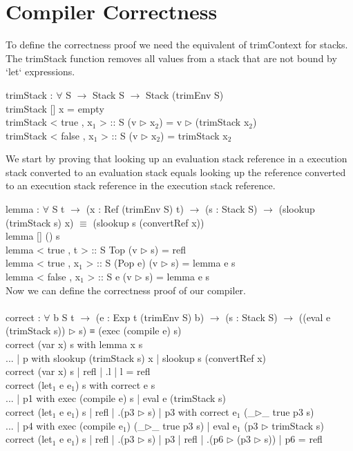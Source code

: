 \documentclass[paper=a4, fontsize=11pt]{scrartcl} %
\numberwithin{equation}{section} %
\numberwithin{figure}{section} %
\numberwithin{table}{section} %
\begin{document}
\section{Compiler Correctness}
To define the correctness proof we need the equivalent of trimContext for stacks. The trimStack function removes all values from a stack that are not bound by `let` expressions.\\
\ttfamily

trimStack : $\forall$ {S} $\rightarrow$ Stack S $\rightarrow$ Stack (trimEnv S)\\
trimStack {[]} x = empty\\
trimStack {< true , x$_1$ > :: S} (v $\rhd$ x$_2$) = v $\rhd$ (trimStack x$_2$)\\
trimStack {< false , x$_1$ > :: S} (v $\rhd$ x$_2$) = trimStack x$_2$\\

\normalfont

We start by proving that looking up an evaluation stack reference in a execution stack converted to an evaluation stack equals looking up the reference converted to an execution stack reference in the execution stack reference.\\
\ttfamily

lemma : $\forall$ {S t} $\rightarrow$ (x : Ref (trimEnv S) t) $\rightarrow$ (s : Stack S) $\rightarrow$ (slookup (trimStack s) x) $\equiv$ (slookup s (convertRef x))\\
lemma {[]} () s\\
lemma {< true , t > :: S} Top (v $\rhd$ s) = refl\\
lemma {< true , x$_1$ > :: S} (Pop e) (v $\rhd$ s) = lemma e s\\
lemma {< false , x$_1$ > :: S} e (v $\rhd$ s) = lemma e s\\

\normalfont
Now we can define the correctness proof of our compiler.\\
\ttfamily
\\
correct : $\forall$ {b S t} $\rightarrow$ (e : Exp t (trimEnv S) b) $\rightarrow$ (s : Stack S) $\rightarrow$ ((eval e (trimStack s)) $\rhd$ s) ≡ (exec (compile e) s)\\
correct (var x) s with lemma x s\\
... | p with slookup (trimStack s) x | slookup s (convertRef x) \\
correct (var x) s | refl | .l | l = refl\\
correct (let$_1$ e e$_1$) s with correct e s\\
... | p1 with exec (compile e) s | eval e (trimStack s)\\
correct (let$_1$ e e$_1$) s | refl | .(p3 $\rhd$ s) | p3 with correct e$_1$ (\_$\rhd$\_ {true} p3 s)\\
... | p4 with exec (compile e$_1$) (\_$\rhd$\_ {true} p3 s) | eval e$_1$ (p3 $\rhd$ trimStack s)\\
correct (let$_1$ e e$_1$) s | refl | .(p3 $\rhd$ s) | p3 | refl | .(p6 $\rhd$ (p3 $\rhd$ s)) | p6 = refl\\
\normalfont
\end{document}
